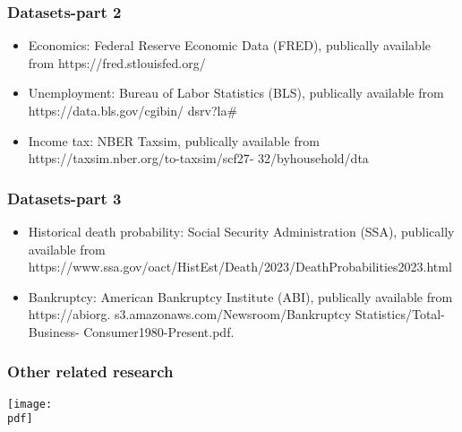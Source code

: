 \documentclass[11pt,xcolor={dvipsnames},hyperref={pdftex,pdfpagemode=UseNone,hidelinks,pdfdisplaydoctitle=true},usepdftitle=false]{beamer}
\newcommand{\pdf}{figures.pdf}
\begin{document}
\begin{frame}
\frametitle{Datasets-part 2}
\begin{itemize}
\item Economics: Federal Reserve Economic Data (FRED), publically available from https://fred.stlouisfed.org/
\item Unemployment: Bureau of Labor Statistics (BLS), publically available from https://data.bls.gov/cgibin/
dsrv?la#
\item Income tax: NBER Taxsim, publically available from https://taxsim.nber.org/to-taxsim/scf27-
32/byhousehold/dta\\
\end{itemize}
\end{frame}



\begin{frame}
\frametitle{Datasets-part 3}
\begin{itemize}

\item Historical death probability: Social Security Administration (SSA), publically available from https://www.ssa.gov/oact/HistEst/Death/2023/DeathProbabilities2023.html
\item Bankruptcy: American Bankruptcy Institute (ABI), publically available from https://abiorg.
s3.amazonaws.com/Newsroom/Bankruptcy Statistics/Total-Business-
Consumer1980-Present.pdf.
\end{itemize}
\end{frame}

\begin{frame}
\frametitle{Other related research}
\texttt{[image: \\pdf]}%
\end{frame}
\end{document}
